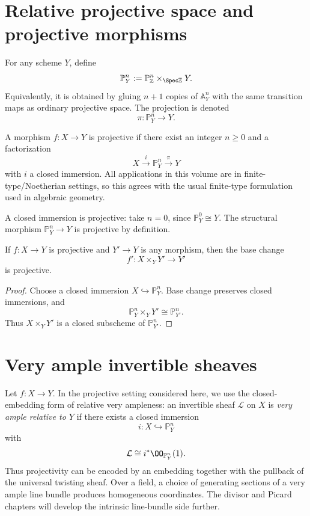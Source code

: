 \section{Relative projective space and projective morphisms}
For any scheme \(Y\), define
\[
  \mathbb P^n_Y:=\mathbb P^n_{\mathbb Z}\times_{\Spec\mathbb Z}Y.
\]
Equivalently, it is obtained by gluing \(n+1\) copies of \(\mathbb A^n_Y\) with the same transition maps as ordinary projective space.  The projection is denoted
\[
  \pi:\mathbb P^n_Y\longrightarrow Y.
\]

\begin{definition}\label{def:vi38-projective-morphism}
A morphism \(f:X\to Y\) is projective if there exist an integer \(n\ge0\) and a factorization
\[
  X\xrightarrow{i}\mathbb P^n_Y\xrightarrow{\pi}Y
\]
with \(i\) a closed immersion.  All applications in this volume are in finite-type/Noetherian settings, so this agrees with the usual finite-type formulation used in algebraic geometry.
\end{definition}



A closed immersion is projective: take \(n=0\), since \(\mathbb P^0_Y\cong Y\).  The structural morphism \(\mathbb P^n_Y\to Y\) is projective by definition.

\begin{theorem}\label{thm:vi38-projective-basechange}
If \(f:X\to Y\) is projective and \(Y'\to Y\) is any morphism, then the base change
\[
  f':X\times_Y Y'\longrightarrow Y'
\]
is projective.
\end{theorem}

\begin{proof}
Choose a closed immersion \(X\hookrightarrow\mathbb P^n_Y\).  Base change preserves closed immersions, and
\[
  \mathbb P^n_Y\times_Y Y'\cong\mathbb P^n_{Y'}.
\]
Thus \(X\times_Y Y'\) is a closed subscheme of \(\mathbb P^n_{Y'}\).
\end{proof}

\section{Very ample invertible sheaves}
Let \(f:X\to Y\).  In the projective setting considered here, we use the closed-embedding form of relative very ampleness: an invertible sheaf \(\mathcal L\) on \(X\) is \emph{very ample relative to \(Y\)} if there exists a closed immersion
\[
  i:X\hookrightarrow\mathbb P^n_Y
\]
with
\[
  \mathcal L\cong i^*\OO_{\mathbb P^n_Y}(1).
\]
Thus projectivity can be encoded by an embedding together with the pullback of the universal twisting sheaf.  Over a field, a choice of generating sections of a very ample line bundle produces homogeneous coordinates.  The divisor and Picard chapters will develop the intrinsic line-bundle side further.

